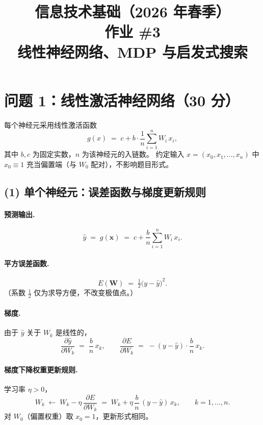 \documentclass[12pt]{article}
\begin{document}
\title{信息技术基础（2026 年春季）\\ 作业 \#3 \\ 线性神经网络、MDP 与启发式搜索}
\author{}
\date{}
\maketitle

\section*{问题 1：线性激活神经网络（30 分）}

每个神经元采用线性激活函数
\[
g(x)\;=\;c + b\cdot\frac{1}{n}\sum_{i=1}^{n} W_i\,x_i,
\]
其中 $b,c$ 为固定实数，$n$ 为该神经元的入链数。
约定输入 $x = (x_0,x_1,\dots,x_n)$ 中 $x_0\equiv 1$ 充当偏置端（与 $W_0$ 配对），不影响题目形式。

\subsection*{(1) 单个神经元：误差函数与梯度更新规则}

\paragraph{预测输出.}
\[
\hat{y}\;=\;g(\mathbf{x})\;=\;c+\frac{b}{n}\sum_{i=1}^{n}W_i\,x_i.
\]

\paragraph{平方误差函数.}
\[
\boxed{\;
E(\mathbf{W})\;=\;\tfrac{1}{2}\bigl(y-\hat{y}\bigr)^{2}.
\;}
\]
（系数 $\tfrac12$ 仅为求导方便，不改变极值点。）

\paragraph{梯度.}
由于 $\hat{y}$ 关于 $W_k$ 是线性的，
\[
\frac{\partial \hat{y}}{\partial W_k}\;=\;\frac{b}{n}\,x_k,
\qquad
\frac{\partial E}{\partial W_k}\;=\;-(y-\hat{y})\cdot\frac{b}{n}\,x_k.
\]

\paragraph{梯度下降权重更新规则.}
学习率 $\eta>0$，
\[
\boxed{\;
W_k \;\leftarrow\; W_k - \eta\,\frac{\partial E}{\partial W_k}
\;=\; W_k + \eta\,\frac{b}{n}\,(y-\hat{y})\,x_k,\qquad k=1,\dots,n.
\;}
\]
对 $W_0$（偏置权重）取 $x_0=1$，更新形式相同。
\end{document}
